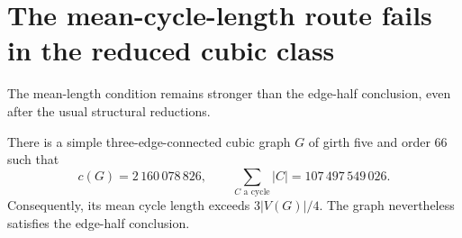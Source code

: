 \section{The mean-cycle-length route fails in the reduced cubic class}
\label{sec:path-edge-half-mean-counterexample}

The mean-length condition remains stronger than the edge-half conclusion, even after the usual structural reductions.

\begin{proposition}\label{prop:path-edge-half-mean-counterexample}
There is a simple three-edge-connected cubic graph $G$ of girth five and order $66$ such that
\[
 c(G)=2\,160\,078\,826,\qquad
 \sum_{C\text{ a cycle}}|C|=107\,497\,549\,026.
\]
Consequently, its mean cycle length exceeds $3|V(G)|/4$.
The graph nevertheless satisfies the edge-half conclusion.
\end{proposition}

